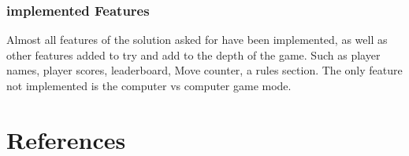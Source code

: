\documentclass[10pt, a4paper]{article}
\begin{document}
	\subsubsection{implemented Features}
Almost all features of the solution asked for have been implemented, as well as other features added to try and add to the depth of the game. Such as player names, player scores, leaderboard, Move counter, a rules section. The only feature not implemented is the computer vs computer game mode.

 \newpage
	


	\section{References}
	
	
    



		
\end{document}

